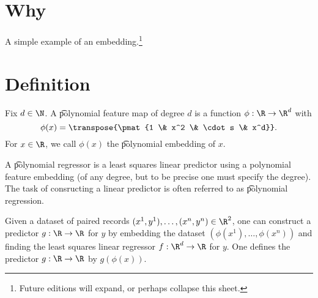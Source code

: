 

\section*{Why}

A simple example of an embedding.\footnote{Future editions will expand, or perhaps collapse this sheet.}

\section*{Definition}

Fix $d \in \N$.
A \t{polynomial feature map} of degree $d$ is a function $\phi : \R  \to \R ^d$ with
    \[
\phi (x) = \transpose{\pmat{1 \& x^2 \& \cdot s \& x^d}}.
    \]
For $x \in \R $, we call $\phi (x)$ the \t{polynomial embedding} of $x$.

A \t{polynomial regressor} is a least squares linear predictor using a polynomial feature embedding (of any degree, but to be precise one must specify the degree).
The task of consructing a linear predictor is often referred to as \t{polynomial regression}.

Given a dataset of paired records $(x^1, y^1), \dots , (x^n, y^n) \in \R ^2$, one can construct a predictor $g: \R  \to \R $ for $y$ by embedding the dataset $(\phi (x^1), \dots , \phi (x^n))$ and finding the least squares linear regressor $f: \R ^d \to \R $ for $y$.
One defines the predictor $g: \R  \to \R $ by $g(\phi (x))$.

\blankpage